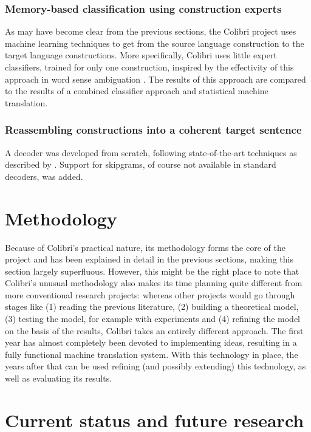 \documentclass[12pt]{article}
\begin{document}
\subsubsection{Memory-based classification using construction experts}
As may have become clear from the previous sections, the Colibri project uses machine learning techniques to get from the source language construction to the target language constructions. More specifically, Colibri uses little expert classifiers, trained for only one construction, inspired by the effectivity of this approach in word sense ambiguation \citep{vangompel10}. The results of this approach are compared to the results of a combined classifier approach and statistical machine translation.

\subsubsection{Reassembling constructions into a coherent target sentence}
A decoder was developed from scratch, following state-of-the-art techniques as described by \citet{koehn03}. Support for skipgrams, of course not available in standard decoders, was added.




\section{Methodology}

Because of Colibri's practical nature, its methodology forms the core of the project and has been explained in detail in the previous sections, making this section largely superfluous. However, this might be the right place to note that Colibri's unusual methodology also makes its time planning quite different from more conventional research projects: whereas other projects would go through stages like (1) reading the previous literature, (2) building a theoretical model, (3) testing the model, for example with experiments and (4) refining the model on the basis of the results, Colibri takes an entirely different approach. The first year has almost completely been devoted to implementing ideas, resulting in a fully functional machine translation system. With this technology in place, the years after that can be used refining (and possibly extending) this technology, as well as evaluating its results.





\section{Current status and future research}
\end{document}
